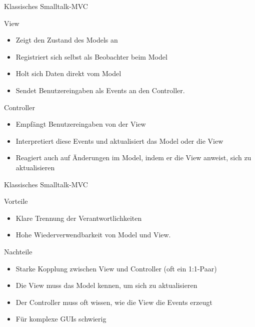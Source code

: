 \begin{frame}{Klassisches Smalltalk-MVC}
	\begin{block}{View}
		\begin{itemize}
		  \item Zeigt den Zustand des Models an
		  \item Registriert sich selbst als Beobachter beim Model
		  \item Holt sich Daten direkt vom Model
		  \item Sendet Benutzereingaben als Events an den Controller. 
		\end{itemize}
	\end{block}
	\pause
	\begin{block}{Controller}
		\begin{itemize}
		  \item Empfängt Benutzereingaben von der View
		  \item Interpretiert diese Events und aktualisiert das Model oder die View
		  \item Reagiert auch auf Änderungen im Model, indem er die View anweist, sich zu aktualisieren 
		\end{itemize}
	\end{block}
\end{frame}

\begin{frame}{Klassisches Smalltalk-MVC}
	\begin{exampleblock}{Vorteile}
		\begin{itemize}
		  \item Klare Trennung der Verantwortlichkeiten
		  \item Hohe Wiederverwendbarkeit von Model und View.
		\end{itemize}
	\end{exampleblock}
	\pause
	\begin{alertblock}{Nachteile}
		\begin{itemize}
		  \item Starke Kopplung zwischen View und Controller (oft ein 1:1-Paar)
		  \item Die View muss das Model kennen, um sich zu aktualisieren
		  \item Der Controller muss oft wissen, wie die View die Events erzeugt
		  \item Für komplexe GUIs schwierig 
		\end{itemize}
	\end{alertblock}
\end{frame}

